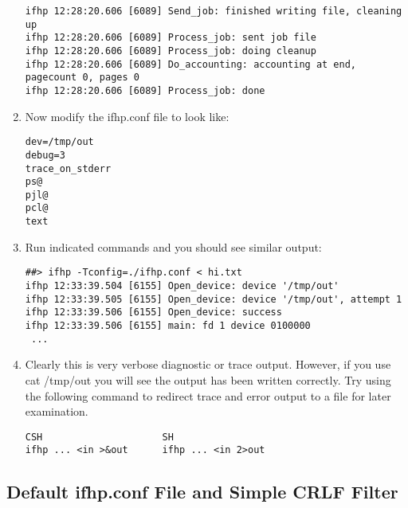 \documentclass[a4paper]{article}
\begin{document}
\begin{enumerate}
\begin{tscreen}
\begin{verbatim}
ifhp 12:28:20.606 [6089] Send_job: finished writing file, cleaning up
ifhp 12:28:20.606 [6089] Process_job: sent job file
ifhp 12:28:20.606 [6089] Process_job: doing cleanup
ifhp 12:28:20.606 [6089] Do_accounting: accounting at end, pagecount 0, pages 0
ifhp 12:28:20.606 [6089] Process_job: done
\end{verbatim}
\end{tscreen}
\item Now modify the
{\ttfamily ifhp.conf} file to look like:
\begin{tscreen}
\begin{verbatim}
dev=/tmp/out
debug=3
trace_on_stderr
ps@ 
pjl@
pcl@
text
\end{verbatim}
\end{tscreen}
\item Run indicated commands and you should see similar output:
\begin{tscreen}
\begin{verbatim}
##> ifhp -Tconfig=./ifhp.conf < hi.txt
ifhp 12:33:39.504 [6155] Open_device: device '/tmp/out'
ifhp 12:33:39.505 [6155] Open_device: device '/tmp/out', attempt 1
ifhp 12:33:39.506 [6155] Open_device: success
ifhp 12:33:39.506 [6155] main: fd 1 device 0100000
 ...
\end{verbatim}
\end{tscreen}
\item Clearly this is very verbose diagnostic or trace output.  However,
if you use
{\ttfamily cat /tmp/out}
you will see the output has been written correctly.
Try using the following command to redirect trace and error output
to a file for later examination.
\begin{tscreen}
\begin{verbatim}
CSH                     SH
ifhp ... <in >&out      ifhp ... <in 2>out
\end{verbatim}
\end{tscreen}
\end{enumerate}



\subsection{Default ifhp.conf File and Simple CRLF Filter}
\end{document}

